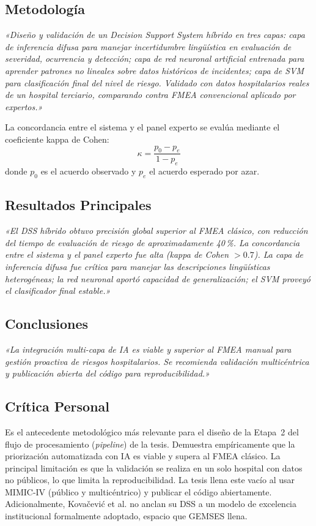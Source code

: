 \documentclass[11pt,a4paper]{article}
\newcommand{\cita}[1]{{\color{navy}\textit{«#1»}}}
\begin{document}
\subsection{Metodología}
\cita{Diseño y validación de un Decision Support System híbrido en tres capas: capa de inferencia difusa para manejar incertidumbre lingüística en evaluación de severidad, ocurrencia y detección; capa de red neuronal artificial entrenada para aprender patrones no lineales sobre datos históricos de incidentes; capa de SVM para clasificación final del nivel de riesgo. Validado con datos hospitalarios reales de un hospital terciario, comparando contra FMEA convencional aplicado por expertos.}

La concordancia entre el sistema y el panel experto se evalúa mediante el coeficiente kappa de Cohen:
\begin{equation}
\kappa = \frac{p_{0} - p_{e}}{1 - p_{e}}
\end{equation}
donde $p_{0}$ es el acuerdo observado y $p_{e}$ el acuerdo esperado por azar.

\subsection{Resultados Principales}
\cita{El DSS híbrido obtuvo precisión global superior al FMEA clásico, con reducción del tiempo de evaluación de riesgo de aproximadamente 40\,\%. La concordancia entre el sistema y el panel experto fue alta (kappa de Cohen $>0.7$). La capa de inferencia difusa fue crítica para manejar las descripciones lingüísticas heterogéneas; la red neuronal aportó capacidad de generalización; el SVM proveyó el clasificador final estable.}

\subsection{Conclusiones}
\cita{La integración multi-capa de IA es viable y superior al FMEA manual para gestión proactiva de riesgos hospitalarios. Se recomienda validación multicéntrica y publicación abierta del código para reproducibilidad.}

\subsection{Crítica Personal}
Es el antecedente metodológico más relevante para el diseño de la Etapa~2 del flujo de procesamiento (\textit{pipeline}) de la tesis. Demuestra empíricamente que la priorización automatizada con IA es viable y supera al FMEA clásico. La principal limitación es que la validación se realiza en un solo hospital con datos no públicos, lo que limita la reproducibilidad. La tesis llena este vacío al usar MIMIC-IV (público y multicéntrico) y publicar el código abiertamente. Adicionalmente, Kovačević et al. no anclan su DSS a un modelo de excelencia institucional formalmente adoptado, espacio que GEMSES llena.
\end{document}
